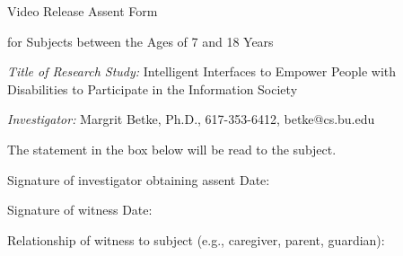 \setlength{\textheight}{8.5in}
\setlength{\footheight}{0.0in}
\setlength{\topmargin}{0in}   %
\setlength{\headheight}{0.0in}
\setlength{\headsep}{0.0in}
\setlength{\textwidth}{6.6in}
\setlength{\oddsidemargin}{0in}
\setlength{\parindent}{0pc}
\setlength{\parskip}{6pt plus 1.5pt minus 1.5pt}


\signature{\vspace*{-.7cm} Margrit Betke,\\ Assistant Professor}


\pagestyle{empty}

\begin{letter}

\centerline{\Large Video Release Assent Form}

\centerline{\large for Subjects between the Ages of 7 and 18 Years }


\vspace*{.5cm}


{\em Title of Research Study:}
Intelligent Interfaces to Empower People with Disabilities to
Participate in the Information Society

{\em Investigator:} Margrit Betke, Ph.D., 617-353-6412,
betke@cs.bu.edu

The statement in the box below will be read to the subject.

\begin{center}
\end{center}

\vspace{.5cm}




Signature of investigator obtaining assent \hrulefill  Date: \hrulefill


Signature of witness \hrulefill  Date: \hrulefill

\vspace{0.2cm}

Relationship of witness to subject (e.g., caregiver, parent,
guardian):  \hrulefill

\end{letter}

 